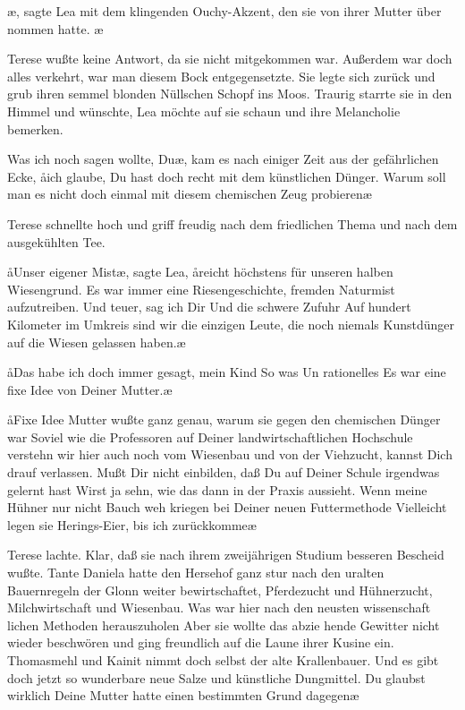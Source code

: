 \aanah{}\ae{}, sagte Lea mit
dem klingenden Ouchy-Akzent, den sie von ihrer Mutter über\-%
nommen hatte. \aanah{}\ae{}

Terese wußte keine Antwort, da sie nicht mitgekommen war.
Außerdem war doch alles verkehrt, war man diesem Bock
entgegensetzte. Sie legte sich zurück und grub ihren semmel\-%
blonden Nüllschen Schopf ins Moos. Traurig starrte sie in
den Himmel und wünschte, Lea möchte auf sie schaun und ihre
Melancholie bemerken.

\aanah{}Was ich noch sagen wollte, Du\ae{}, kam es nach einiger Zeit aus
der gefährlichen Ecke, \aa{}ich glaube, Du hast doch recht mit dem
künstlichen Dünger. Warum soll man es nicht doch einmal mit
diesem chemischen Zeug probieren\frag{}\ae{}

Terese schnellte hoch und griff freudig nach dem friedlichen
Thema und nach dem ausgekühlten Tee.

\aa{}Unser eigener Mist\ae{}, sagte Lea, \aa{}reicht höchstens für unseren
halben Wiesengrund. Es war immer eine Riesengeschichte,
fremden Naturmist aufzutreiben. Und teuer, sag ich Dir\ausr{}
Und die schwere Zufuhr\ausr{} Auf hundert Kilometer im Umkreis
sind wir die einzigen Leute, die noch niemals Kunstdünger
auf die Wiesen gelassen haben.\ae{}

\aa{}Das habe ich doch immer gesagt, mein Kind\ausr{} So was Un\-%
rationelles\ausr{} Es war eine fixe Idee von Deiner Mutter.\ae{}

\aa{}Fixe Idee\ausr{} Mutter wußte ganz genau, warum sie gegen
den chemischen Dünger war\ausr{} Soviel wie die Professoren auf
Deiner landwirtschaftlichen Hochschule verstehn wir hier
auch noch vom Wiesenbau und von der Viehzucht, kannst Dich
drauf verlassen. Mußt Dir nicht einbilden, daß Du auf Deiner
Schule irgendwas gelernt hast\ausr{} Wirst ja sehn, wie das dann
in der Praxis aussieht. Wenn meine Hühner nur nicht Bauch\-%
weh kriegen bei Deiner neuen Futtermethode\ausr{} Vielleicht
legen sie Herings-Eier, bis ich zurückkomme\frag{}\ae{}

Terese lachte. Klar, daß sie nach ihrem zweijährigen Studium
besseren Bescheid wußte. Tante Daniela hatte den Hersehof
ganz stur nach den uralten Bauernregeln der Glonn weiter\-%
bewirtschaftet, Pferdezucht und Hühnerzucht, Milchwirtschaft
und Wiesenbau. Was war hier nach den neusten wissenschaft\-%
lichen Methoden herauszuholen\ausr{} Aber sie wollte das abzie\-%
hende Gewitter nicht wieder beschwören und ging freundlich
auf die Laune ihrer Kusine ein. \aanah{}Thomasmehl und Kainit
nimmt doch selbst der alte Krallenbauer. Und es gibt doch
jetzt so wunderbare neue Salze und künstliche Dungmittel.
Du glaubst wirklich Deine Mutter hatte einen bestimmten
Grund dagegen\frag{}\ae{}

